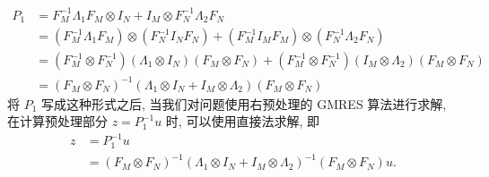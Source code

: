 \documentclass{ecnumaster}
\begin{document}
\begin{align*}
    P_1 &= F_M^{-1}\Lambda _1F_M \otimes I_N + I_M \otimes F_N^{-1} \Lambda _2 F_N\\
        &= (F_M^{-1}\Lambda _1 F_M) \otimes (F_N^{-1} I_N F_N) +
        (F_M^{-1} I_M F_M) \otimes (F_N^{-1} \Lambda _2 F_N)\\
    &= (F_M^{-1} \otimes F_N^{-1})(\Lambda _1 \otimes I_N)(F_M \otimes F_N) +
    (F_M^{-1} \otimes F_N^{-1})(I_M \otimes \Lambda _2)(F_M \otimes F_N)\\
   &= (F_M \otimes F_N)^{-1}(\Lambda _1 \otimes I_N + I_M \otimes \Lambda _2)(F_M \otimes F_N)
\end{align*}
将 $P_1$ 写成这种形式之后,
当我们对问题使用右预处理的 GMRES 算法进行求解,
在计算预处理部分 $z=P_1^{-1}u$ 时,
可以使用直接法求解, 即
\begin{align*}
    z &= P_1^{-1} u\\
      &= (F_M \otimes F_N)^{-1} (\Lambda _1 \otimes I_N + I_M \otimes \Lambda_2)^{-1} (F_M \otimes F_N)u.
\end{align*}
\end{document}
